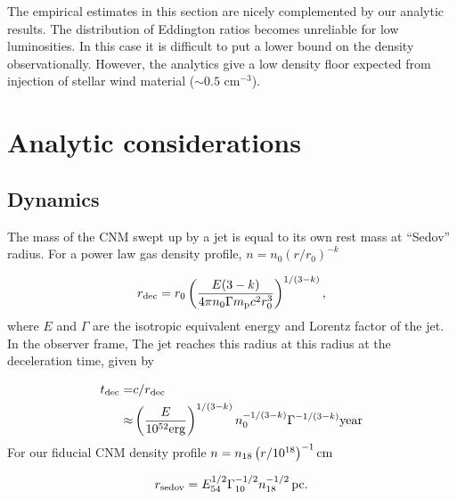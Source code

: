 \documentclass[usenatbib,fleqn]{mnras}
\begin{document}
The empirical estimates in this section are nicely complemented by our
analytic results. The distribution of Eddington ratios becomes
unreliable for low luminosities.  In this case it is difficult to put
a lower bound on the density observationally. However, the analytics
give a low density floor expected from injection of stellar wind
material ($\sim 0.5$ cm$^{-3}$).




\section{Analytic considerations}
\label{sec:jet}

\subsection{Dynamics}
\label{sec:analytic}

The mass of the CNM swept up by a jet is equal to its own rest mass at
``Sedov'' radius. For a power law gas density profile, $n= n_0 \left(r/r_0\right)^{-k}$

\begin{equation}
  r_{\rm dec} = r_0 \left( \frac{E(3-k)}{4\pi n_{0}
      \Gamma m_{\rm p} c^2 r_0^3} \right)^{1/(3-k)}, 
  \label{eq:rdec}
\end{equation}
%
where $E$ and $\Gamma$ are the isotropic equivalent energy and Lorentz
factor of the jet. In the observer frame, The jet reaches this radius
at this radius at the deceleration time, given by

\begin{align}
 t_{\rm dec}= &c/r_{\rm dec} \nonumber\\
 \approx & \left(\frac{E}{10^{52} {\rm erg}}\right)^{1/(3-k)}
 n_0^{-1/(3-k)} \Gamma^{-1/(3-k)}{\rm year}
 \label{eq:tdec}
\end{align}
%
For our fiducial CNM density profile $n=n_{18}\left(r/10^{18}\right)^{-1} {\rm cm}$


\begin{equation}
r_{\rm sedov} = E_{54}^{1/2} \Gamma_{10}^{-1/2} n_{\rm 18}^{-1/2}\,{\rm pc}. 
\end{equation}
\end{document}
